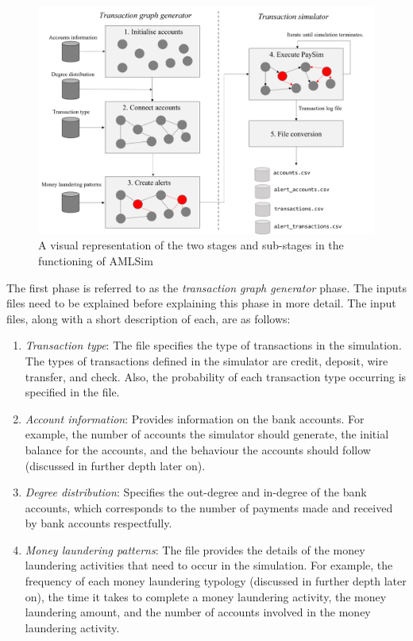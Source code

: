 \begin{figure}
	\begin{center}
		\includegraphics[scale=0.55]{fig/CH3/AML_SIm.PNG}
		\caption{A visual representation of the two stages and sub-stages in the functioning of AMLSim \citep{AMLSim, weber2018scalable, lopez2016applying}}
		\label{fig:ch3_amlsim}
	\end{center}	
\end{figure}

The first phase is referred to as the \textit{transaction graph generator} phase. The inputs files need to be explained before explaining this phase in more detail. The input files, along with a short description of each, are as follows:

\begin{enumerate}
    \item \textit{Transaction type}: The file specifies the type of transactions in the simulation. The types of transactions defined in the simulator are credit, deposit, wire transfer, and check. Also, the probability of each transaction type occurring is specified in the file.
    
    \item \textit{Account information}: Provides information on the bank accounts. For example, the number of accounts the simulator should generate, the initial balance for the accounts, and the behaviour the accounts should follow (discussed in further depth later on).
    
    \item \textit{Degree distribution}: Specifies the out-degree and in-degree of the bank accounts, which corresponds to the number of payments made and received by bank accounts respectfully. 
    
    \item \textit{Money laundering patterns}: The file provides the details of the money laundering activities that need to occur in the simulation. For example, the frequency of each money laundering typology (discussed in further depth later on), the time it takes to complete a money laundering activity, the money laundering amount, and the number of accounts involved in the money laundering activity.    
    
\end{enumerate}

